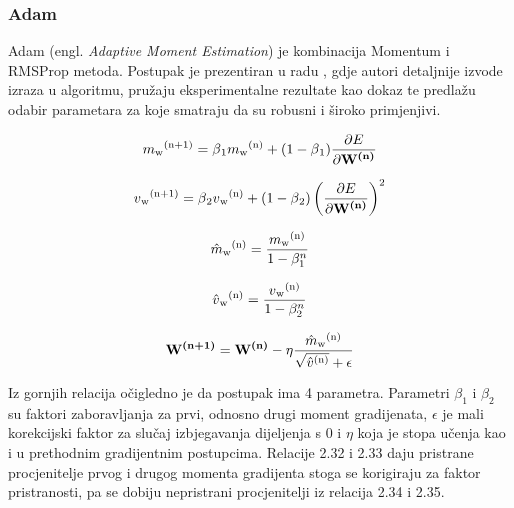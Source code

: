 \documentclass[times, utf8, diplomski]{fer}
\begin{document}
\subsubsection{Adam}
Adam (engl. \textit{Adaptive Moment Estimation}) je kombinacija Momentum i RMSProp metoda. Postupak je prezentiran u radu \cite{adam}, gdje autori detaljnije izvode izraza u algoritmu, pružaju eksperimentalne rezultate kao dokaz te predlažu odabir parametara za koje smatraju da su robusni i široko primjenjivi.

\begin{equation}
m\textsubscript{w}\textsuperscript{(n+1)} = \beta\textsubscript{1}m\textsubscript{w}\textsuperscript{(n)} + (1 - \beta\textsubscript{1})\frac{\partial E}{\partial \textbf{W\textsuperscript{(n)}}}
\end{equation}

\begin{equation}
v\textsubscript{w}\textsuperscript{(n+1)} = \beta\textsubscript{2}v\textsubscript{w}\textsuperscript{(n)} + (1 - \beta\textsubscript{2})\left(\frac{\partial E}{\partial \textbf{W\textsuperscript{(n)}}}\right)^2
\end{equation}

\begin{equation}
\hat{m}\textsubscript{w}\textsuperscript{(n)} = \frac{m\textsubscript{w}\textsuperscript{(n)}}{1 - \beta_{1}^n}
\end{equation}

\begin{equation}
\hat{v}\textsubscript{w}\textsuperscript{(n)} = \frac{v\textsubscript{w}\textsuperscript{(n)}}{1 - \beta_{2}^n}
\end{equation}

\begin{equation}
\textbf{W\textsuperscript{(n+1)}} = \textbf{W\textsuperscript{(n)}} - \eta\frac{\hat{m}\textsubscript{w}\textsuperscript{(n)}}{\sqrt{\hat{v}\textsuperscript{(n)}} + \epsilon}
\end{equation}

Iz gornjih relacija očigledno je da postupak ima 4 parametra. Parametri $\beta_1$ i $\beta_2$ su faktori zaboravljanja za prvi, odnosno drugi moment gradijenata, $\epsilon$ je mali korekcijski faktor za slučaj izbjegavanja dijeljenja s $0$ i $\eta$ koja je stopa učenja kao i u prethodnim gradijentnim postupcima. Relacije 2.32 i 2.33 daju pristrane procjenitelje prvog i drugog momenta gradijenta stoga se korigiraju za faktor pristranosti, pa se dobiju nepristrani procjenitelji iz relacija 2.34 i 2.35.
\end{document}
